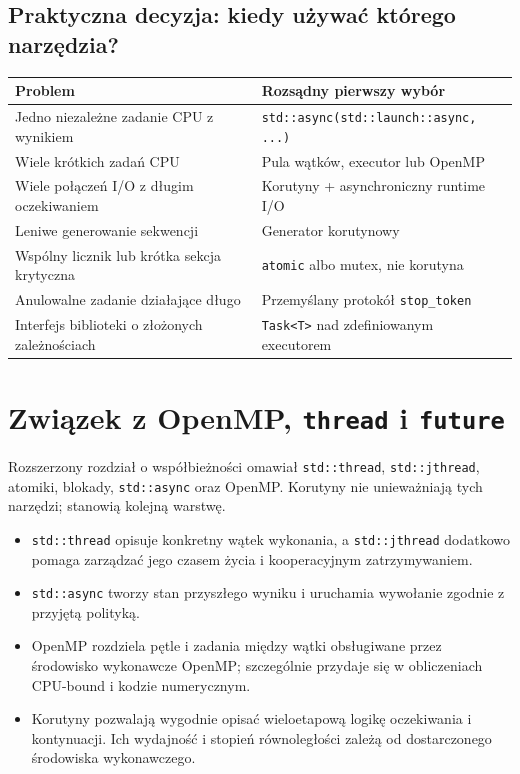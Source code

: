 \subsection{Praktyczna decyzja: kiedy używać którego narzędzia?}

\begin{center}
\small
\begin{tabularx}{\textwidth}{@{}lX@{}}
\toprule
\textbf{Problem} & \textbf{Rozsądny pierwszy wybór} \\
\midrule
Jedno niezależne zadanie CPU z wynikiem & \texttt{std::async(std::launch::async, ...)} \\
Wiele krótkich zadań CPU & Pula wątków, executor lub OpenMP \\
Wiele połączeń I/O z długim oczekiwaniem & Korutyny + asynchroniczny runtime I/O \\
Leniwe generowanie sekwencji & Generator korutynowy \\
Wspólny licznik lub krótka sekcja krytyczna & \texttt{atomic} albo mutex, nie korutyna \\
Anulowalne zadanie działające długo & Przemyślany protokół \texttt{stop\_token} \\
Interfejs biblioteki o złożonych zależnościach & \texttt{Task<T>} nad zdefiniowanym executorem \\
\bottomrule
\end{tabularx}
\end{center}

\section{Związek z OpenMP, \texttt{thread} i \texttt{future}}

Rozszerzony rozdział o współbieżności omawiał \texttt{std::thread},
\texttt{std::jthread}, atomiki, blokady, \texttt{std::async} oraz OpenMP.
Korutyny nie unieważniają tych narzędzi; stanowią kolejną warstwę.
\begin{itemize}
\item \texttt{std::thread} opisuje konkretny wątek wykonania,
      a \texttt{std::jthread} dodatkowo pomaga zarządzać jego
      czasem życia i kooperacyjnym zatrzymywaniem.
\item \texttt{std::async} tworzy stan przyszłego wyniku i
      uruchamia wywołanie zgodnie z przyjętą polityką.
\item OpenMP rozdziela pętle i zadania między wątki obsługiwane
      przez środowisko wykonawcze OpenMP; szczególnie przydaje się
      w obliczeniach CPU-bound i kodzie numerycznym.
\item Korutyny pozwalają wygodnie opisać wieloetapową logikę
      oczekiwania i kontynuacji. Ich wydajność i stopień równoległości
      zależą od dostarczonego środowiska wykonawczego.
\end{itemize}

